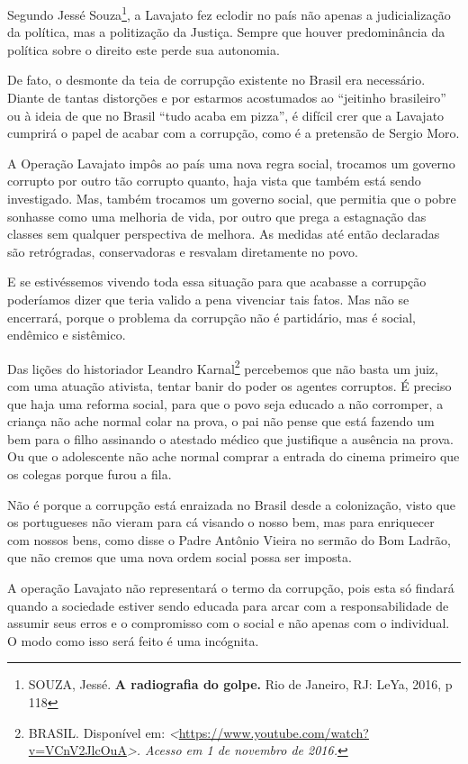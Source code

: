 {Segundo Jessé Souza\footnote{SOUZA, Jessé. \textbf{A radiografia do
  golpe.} Rio de Janeiro, RJ: LeYa, 2016, p 118}, a Lavajato fez eclodir
no país não apenas a judicialização da política, mas a politização da
Justiça. Sempre que houver predominância da política sobre o direito
este perde sua autonomia.

De fato, o desmonte da teia de corrupção existente no Brasil era
necessário. Diante de tantas distorções e por estarmos acostumados ao
``jeitinho brasileiro'' ou à ideia de que no Brasil ``tudo acaba em
pizza'', é difícil crer que a Lavajato cumprirá o papel de acabar com a
corrupção, como é a pretensão de Sergio Moro.

A Operação Lavajato impôs ao país uma nova regra social, trocamos um
governo corrupto por outro tão corrupto quanto, haja vista que também
está sendo investigado. Mas, também trocamos um governo social, que
permitia que o pobre sonhasse como uma melhoria de vida, por outro que
prega a estagnação das classes sem qualquer perspectiva de melhora. As
medidas até então declaradas são retrógradas, conservadoras e resvalam
diretamente no povo.

E se estivéssemos vivendo toda essa situação para que acabasse a
corrupção poderíamos dizer que teria valido a pena vivenciar tais fatos.
Mas não se encerrará, porque o problema da corrupção não é partidário,
mas é social, endêmico e sistêmico.

Das lições do historiador Leandro Karnal\footnote{BRASIL. Disponível em:
  \emph{\textless{}}\href{https://www.youtube.com/watch?v=VCnV2JlcOuA}{{https://www.youtube.com/watch?v=VCnV2JlcOuA}}\emph{\textgreater{}.
  Acesso em 1 de novembro de 2016.}} percebemos que não basta um juiz,
com uma atuação ativista, tentar banir do poder os agentes corruptos. É
preciso que haja uma reforma social, para que o povo seja educado a não
corromper, a criança não ache normal colar na prova, o pai não pense que
está fazendo um bem para o filho assinando o atestado médico que
justifique a ausência na prova. Ou que o adolescente não ache normal
comprar a entrada do cinema primeiro que os colegas porque furou a fila.

Não é porque a corrupção está enraizada no Brasil desde a colonização,
visto que os portugueses não vieram para cá visando o nosso bem, mas
para enriquecer com nossos bens, como disse o Padre Antônio Vieira no
sermão do Bom Ladrão, que não cremos que uma nova ordem social possa ser
imposta.

A operação Lavajato não representará o termo da corrupção, pois esta só
findará quando a sociedade estiver sendo educada para arcar com a
responsabilidade de assumir seus erros e o compromisso com o social e
não apenas com o individual. O modo como isso será feito é uma
incógnita.

}
